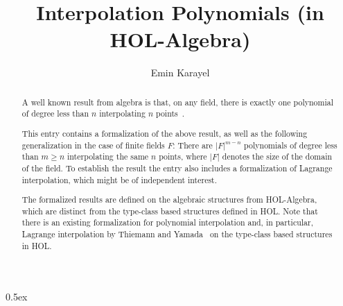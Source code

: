 \documentclass[11pt,a4paper]{article}
\begin{document}
\title{Interpolation Polynomials (in HOL-Algebra)}
\author{Emin Karayel}
\maketitle
\begin{abstract}
A well known result from algebra is that, on any field, there is exactly one polynomial of degree
less than $n$ interpolating $n$ points~\cite[]{shoup2009computational}.

This entry contains a formalization of the above result, as well as the following generalization
in the case of finite fields $F$: There are $\lvert F\rvert^{m-n}$ polynomials of degree less
than $m \geq n$ interpolating the same $n$ points, where $\lvert F \rvert$ denotes the size of the
domain of the field. To establish the result the entry also includes a formalization of 
Lagrange interpolation, which might be of independent interest.

The formalized results are defined on the algebraic structures from HOL-Algebra, which are
distinct from the type-class based structures defined in HOL. Note that there is an existing 
formalization for polynomial interpolation and, in particular, Lagrange interpolation by Thiemann and
Yamada~\cite{Polynomial_Interpolation-AFP} on the type-class based structures in HOL.
\end{abstract}

\tableofcontents

\parindent 0pt\parskip 0.5ex





\end{document}
